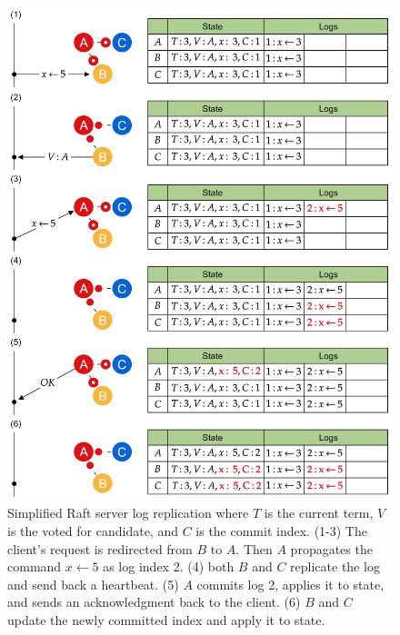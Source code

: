 \begin{figure}[ht!]
    \centering
    \includegraphics[width=.869\textwidth]{Sections/raft/logs.png}
    \caption{Simplified Raft server log replication where $T$ is the current term, $V$ is the voted for candidate, and $C$ is the commit index. (1-3) The client's request is redirected from $B$ to $A$. 
    Then $A$ propagates the command $x\leftarrow 5$ as log index 2. (4) both $B$ and $C$ replicate the log and send back a heartbeat. (5) $A$ commits log 2, applies it to state, and sends an acknowledgment back to the client.
    (6) $B$ and $C$ update the newly committed index and apply it to state.}
\end{figure}
\newpage

